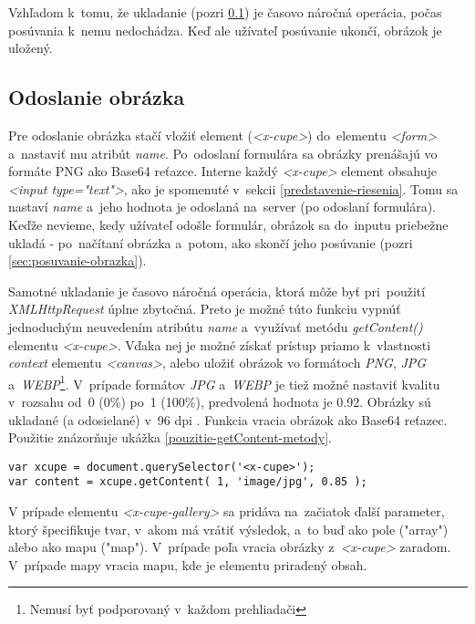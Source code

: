 Vzhľadom k~tomu, že ukladanie (pozri \ref{sec:odoslanie-obrazka}) je časovo náročná operácia, počas posúvania k~nemu nedochádza. Keď ale užívateľ posúvanie ukončí, obrázok je uložený.

\subsection{Odoslanie obrázka}
\label{sec:odoslanie-obrazka}

Pre odoslanie obrázka stačí vložiť element (\emph{<x-cupe>}) do~elementu \emph{<form>} a~nastaviť mu atribút \emph{name}. Po~odoslaní formulára sa obrázky prenášajú vo formáte PNG ako Base64 reťazce. Interne každý \emph{<x-cupe>} element obsahuje \emph{<input type="text"\textgreater}, ako je spomenuté v~sekcii \ref{predstavenie-riesenia}. Tomu sa nastaví \emph{name} a~jeho hodnota je odoslaná na~server (po odoslaní formulára). Keďže nevieme, kedy užívateľ odošle formulár, obrázok sa do~inputu priebežne ukladá - po~načítaní obrázka a~potom, ako skončí jeho posúvanie (pozri \ref{sec:posuvanie-obrazka}).

Samotné ukladanie je časovo náročná operácia, ktorá môže byť pri~použití \emph{XMLHttpRequest} úplne zbytočná. Preto je možné túto funkciu vypnúť jednoduchým neuvedením atribútu \emph{name} a~využívať metódu \emph{getContent()} elementu \emph{<x-cupe>}. Vďaka nej je možné získať prístup priamo k~vlastnosti \emph{context} elementu \emph{<canvas>}, alebo uložiť obrázok vo formátoch \emph{PNG}, \emph{JPG} a~\emph{WEBP}\footnote{Nemusí byť podporovaný v~každom prehliadači}. V~prípade formátov \emph{JPG} a~\emph{WEBP} je tiež možné nastaviť kvalitu v~rozsahu od~0 (0\%) po~1 (100\%), predvolená hodnota je 0.92. Obrázky sú ukladané (a odosielané) v~96 dpi \cite{Canvas_toURL}. Funkcia vracia obrázok ako Base64 reťazec. Použitie znázorňuje ukážka \ref{pouzitie-getContent-metody}.

\begin{lstlisting}[label=pouzitie-getContent-metody,caption=Použitie metódy getContent() pre~získanie obrázka.]
var xcupe = document.querySelector('<x-cupe>');
var content = xcupe.getContent( 1, 'image/jpg', 0.85 );
\end{lstlisting}

V prípade elementu \emph{<x-cupe-gallery>} sa pridáva na~začiatok ďalší parameter, ktorý špecifikuje tvar, v~akom má vrátiť výsledok, a~to buď ako pole ("array") alebo ako mapu ("map"). V~prípade poľa vracia obrázky z~\emph{<x-cupe>} zaradom. V~prípade mapy vracia mapu, kde je elementu priradený obsah.

